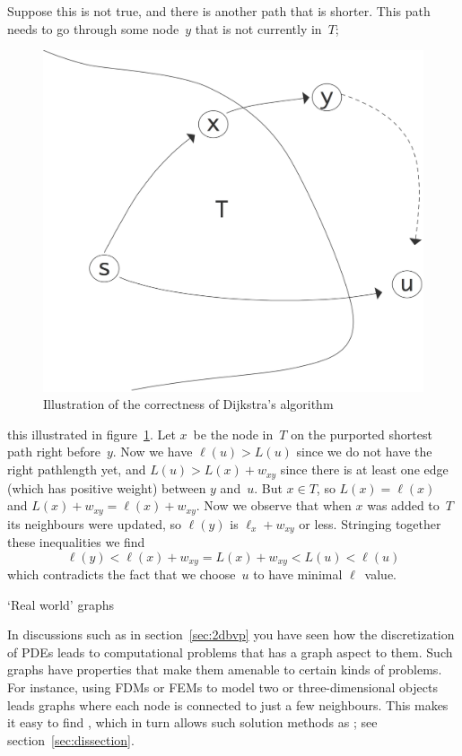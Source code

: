 Suppose this is not true, and there is another path that is shorter.
This path needs to go through some node~$y$ that is not currently in~$T$;
\begin{figure}[ht]
  \includegraphics[scale=.12]{graphics-public/dijkstra-proof}
  \caption{Illustration of the correctness of Dijkstra's algorithm}
  \label{fig:dijkstra-proof}
\end{figure}
this illustrated in figure~\ref{fig:dijkstra-proof}.
Let $x$~be the node in~$T$ on the purported shortest path right before~$y$.
Now we have $\ell(u)>L(u)$ since we do not have the right pathlength
yet, and $L(u)>L(x)+w_{xy}$ since there is at least one edge (which has 
positive weight) between $y$ and~$u$. But $x\in T$, so $L(x)=\ell(x)$
and $L(x)+w_{xy}=\ell(x)+w_{xy}$. Now we observe that when $x$ was
added to~$T$ its neighbours were updated, so $\ell(y)$ is $\ell_x+w_{xy}$ or less.
Stringing together these inequalities we find 
\[ \ell(y)<\ell(x)+w_{xy}=L(x)+w_{xy}<L(u)<\ell(u) \]
which contradicts the fact that we choose~$u$ to have minimal $\ell$~value.

 {`Real world' graphs}

In discussions such as in section~\ref{sec:2dbvp} you have seen how
the discretization of \acp{PDE} leads to computational problems that
has a graph aspect to them. Such graphs have properties that make them
amenable to certain kinds of problems.
%
For instance, using \acp{FDM} or \acp{FEM} to model two or
three-dimensional objects leads graphs where each node is connected to
just a few neighbours. This makes it easy to find
, which in turn allows such solution methods as
; see section~\ref{sec:dissection}.

